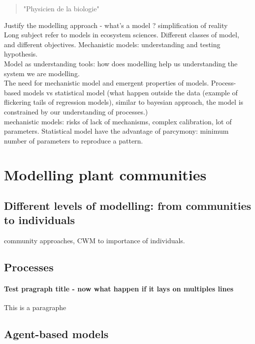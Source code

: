 \begin{quote}
"Physicien de la biologie"
\end{quote}
Justify the modelling approach - what's a model ? simplification of reality\\
Long subject refer to models in ecosystem sciences. Different classes of model, and different objectives. Mechanistic models: understanding and testing hypothesis.\\
Model as understanding tools: how does modelling help us understanding the system we are modelling.\\
The need for mechanistic model and emergent properties of models. Process-based models vs statistical model (what happen outside the data (example of flickering tails of regression models), similar to bayesian approach, the model is constrained by our understanding of processes.) \\
mechanistic models: risks of lack of mechanisms, complex calibration, lot of parameters. Statistical model have the advantage of parcymony: minimum number of parameters to reproduce a pattern.

\section{Modelling plant communities}

\subsection{Different levels of modelling: from communities to individuals}
community approaches, CWM to importance of individuals.\\


\subsection{Processes}
\paragraph{Test pragraph title - now what happen if it lays on multiples lines} This is a paragraphe \lipsum[2]

\marginnote{\lipsum[1]}

\subsection{Agent-based models}

